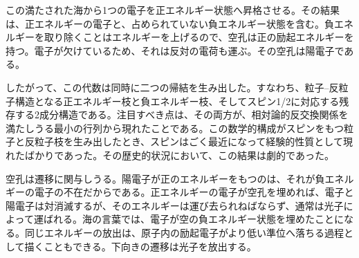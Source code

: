 この満たされた海から1つの電子を正エネルギー状態へ昇格させる。その結果は、正エネルギーの電子と、占められていない負エネルギー状態を含む。負エネルギーを取り除くことはエネルギーを上げるので、空孔は正の励起エネルギーを持つ。電子が欠けているため、それは反対の電荷も運ぶ。その空孔は陽電子である。

\begin{classroomqa}
\end{classroomqa}

したがって、この代数は同時に二つの帰結を生み出した。すなわち、粒子--反粒子構造となる正エネルギー枝と負エネルギー枝、そしてスピン1/2に対応する残存する2成分構造である。注目すべき点は、その両方が、相対論的反交換関係を満たしうる最小の行列から現れたことである。この数学的構成がスピンをもつ粒子と反粒子枝を生み出したとき、スピンはごく最近になって経験的性質として現れたばかりであった。その歴史的状況において、この結果は劇的であった。

\begin{classroomqa}
\end{classroomqa}

空孔は遷移に関与しうる。陽電子が正のエネルギーをもつのは、それが負エネルギーの電子の不在だからである。正エネルギーの電子が空孔を埋めれば、電子と陽電子は対消滅するが、そのエネルギーは運び去られねばならず、通常は光子によって運ばれる。海の言葉では、電子が空の負エネルギー状態を埋めたことになる。同じエネルギーの放出は、原子内の励起電子がより低い準位へ落ちる過程として描くこともできる。下向きの遷移は光子を放出する。

\begin{classroomqa}
\end{classroomqa}

